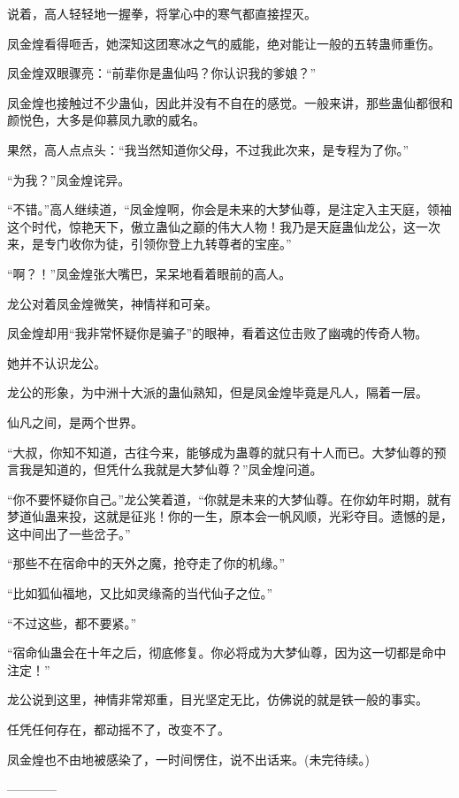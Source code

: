 \begin{this_body}
说着，高人轻轻地一握拳，将掌心中的寒气都直接捏灭。

凤金煌看得咂舌，她深知这团寒冰之气的威能，绝对能让一般的五转蛊师重伤。

凤金煌双眼骤亮：“前辈你是蛊仙吗？你认识我的爹娘？”

凤金煌也接触过不少蛊仙，因此并没有不自在的感觉。一般来讲，那些蛊仙都很和颜悦色，大多是仰慕凤九歌的威名。

果然，高人点点头：“我当然知道你父母，不过我此次来，是专程为了你。”

“为我？”凤金煌诧异。

“不错。”高人继续道，“凤金煌啊，你会是未来的大梦仙尊，是注定入主天庭，领袖这个时代，惊艳天下，傲立蛊仙之巅的伟大人物！我乃是天庭蛊仙龙公，这一次来，是专门收你为徒，引领你登上九转尊者的宝座。”

“啊？！”凤金煌张大嘴巴，呆呆地看着眼前的高人。

龙公对着凤金煌微笑，神情祥和可亲。

凤金煌却用“我非常怀疑你是骗子”的眼神，看着这位击败了幽魂的传奇人物。

她并不认识龙公。

龙公的形象，为中洲十大派的蛊仙熟知，但是凤金煌毕竟是凡人，隔着一层。

仙凡之间，是两个世界。

“大叔，你知不知道，古往今来，能够成为蛊尊的就只有十人而已。大梦仙尊的预言我是知道的，但凭什么我就是大梦仙尊？”凤金煌问道。

“你不要怀疑你自己。”龙公笑着道，“你就是未来的大梦仙尊。在你幼年时期，就有梦道仙蛊来投，这就是征兆！你的一生，原本会一帆风顺，光彩夺目。遗憾的是，这中间出了一些岔子。”

“那些不在宿命中的天外之魔，抢夺走了你的机缘。”

“比如狐仙福地，又比如灵缘斋的当代仙子之位。”

“不过这些，都不要紧。”

“宿命仙蛊会在十年之后，彻底修复。你必将成为大梦仙尊，因为这一切都是命中注定！”

龙公说到这里，神情非常郑重，目光坚定无比，仿佛说的就是铁一般的事实。

任凭任何存在，都动摇不了，改变不了。

凤金煌也不由地被感染了，一时间愣住，说不出话来。(未完待续。)

------------

\end{this_body}

